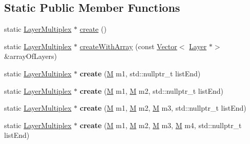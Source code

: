 \subsection*{Static Public Member Functions}
\begin{DoxyCompactItemize}
\item 
static \hyperlink{classLayerMultiplex}{Layer\+Multiplex} $\ast$ \hyperlink{classLayerMultiplex_ab95b14187c4219ab1052b8708052dfdc}{create} ()
\item 
static \hyperlink{classLayerMultiplex}{Layer\+Multiplex} $\ast$ \hyperlink{classLayerMultiplex_ae44d19293d847a1602d353567281a1ff}{create\+With\+Array} (const \hyperlink{classVector}{Vector}$<$ \hyperlink{classLayer}{Layer} $\ast$$>$ \&array\+Of\+Layers)
\item 
\mbox{\label{classLayerMultiplex_abeedbf06c1ca0f438f8938cbccf5ae3c}} 
static \hyperlink{classLayerMultiplex}{Layer\+Multiplex} $\ast$ {\bfseries create} (\hyperlink{classLayerMultiplex_a47ea9ae27cb9c95490a017ab01952487}{M} m1, std\+::nullptr\+\_\+t list\+End)
\item 
\mbox{\label{classLayerMultiplex_a9eee0dfaf1fe6daaf857b1eff44c2e98}} 
static \hyperlink{classLayerMultiplex}{Layer\+Multiplex} $\ast$ {\bfseries create} (\hyperlink{classLayerMultiplex_a47ea9ae27cb9c95490a017ab01952487}{M} m1, \hyperlink{classLayerMultiplex_a47ea9ae27cb9c95490a017ab01952487}{M} m2, std\+::nullptr\+\_\+t list\+End)
\item 
\mbox{\label{classLayerMultiplex_a81f72762016839c1b89af404e3e13f19}} 
static \hyperlink{classLayerMultiplex}{Layer\+Multiplex} $\ast$ {\bfseries create} (\hyperlink{classLayerMultiplex_a47ea9ae27cb9c95490a017ab01952487}{M} m1, \hyperlink{classLayerMultiplex_a47ea9ae27cb9c95490a017ab01952487}{M} m2, \hyperlink{classLayerMultiplex_a47ea9ae27cb9c95490a017ab01952487}{M} m3, std\+::nullptr\+\_\+t list\+End)
\item 
\mbox{\label{classLayerMultiplex_a16a4a13b9b81bf188bf33c111c1d4ea3}} 
static \hyperlink{classLayerMultiplex}{Layer\+Multiplex} $\ast$ {\bfseries create} (\hyperlink{classLayerMultiplex_a47ea9ae27cb9c95490a017ab01952487}{M} m1, \hyperlink{classLayerMultiplex_a47ea9ae27cb9c95490a017ab01952487}{M} m2, \hyperlink{classLayerMultiplex_a47ea9ae27cb9c95490a017ab01952487}{M} m3, \hyperlink{classLayerMultiplex_a47ea9ae27cb9c95490a017ab01952487}{M} m4, std\+::nullptr\+\_\+t list\+End)
$$
\end{DoxyCompactItemize}

